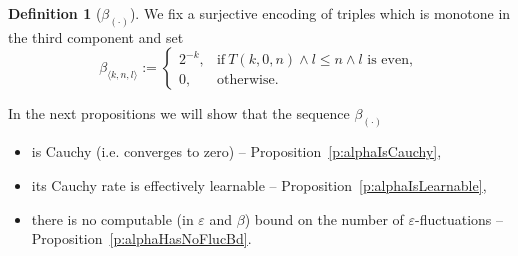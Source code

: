 \documentclass[1p]{elsarticle}
\newcommand{\Tif}{\text{if}\ }
\newcommand{\Telse}{\text{otherwise}}
\theoremstyle{plain}
\theoremstyle{definition}
\newtheorem{dfn}[thm]{Definition}
\theoremstyle{remark}
\renewcommand{\epsilon}{\varepsilon}
\theoremstyle{definition}
\begin{document}
{\begin{dfn}[$\beta_{(\cdot)}$] 
We fix a surjective encoding of triples which is monotone in the third component and set
\[
\beta_{\langle k,n,l\rangle}:=
\begin{cases}
2^{-k}, &\Tif T(k,0,n) \wedge l\leq n \wedge l\text{ is even},\\
0, &\Telse.
\end{cases}
\]
\end{dfn}

In the next propositions we will show that the sequence $\beta_{(\cdot)}$
\begin{itemize}
\item is Cauchy (i.e. converges to zero) -- Proposition~\ref{p:alphaIsCauchy},
\item its Cauchy rate is effectively learnable -- Proposition~\ref{p:alphaIsLearnable},
\item there is no computable (in $\epsilon$ and $\beta$) bound on the number of $\epsilon$-fluctuations -- Proposition~\ref{p:alphaHasNoFlucBd}.
\end{itemize}

}
\end{document}
